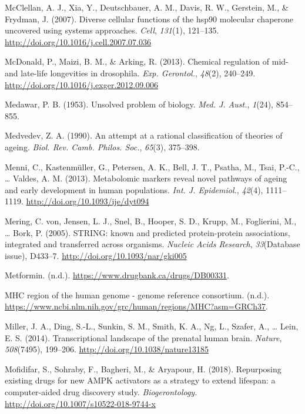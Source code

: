 \documentclass[12pt,twoside]{unicam}
\begin{document}
\begin{cslreferences}
\leavevmode\hypertarget{ref-McClellan2007}{}%
McClellan, A. J., Xia, Y., Deutschbauer, A. M., Davis, R. W., Gerstein, M., \& Frydman, J. (2007). Diverse cellular functions of the hsp90 molecular chaperone uncovered using systems approaches. \emph{Cell}, \emph{131}(1), 121--135. \url{http://doi.org/10.1016/j.cell.2007.07.036}

\leavevmode\hypertarget{ref-McDonald2013}{}%
McDonald, P., Maizi, B. M., \& Arking, R. (2013). Chemical regulation of mid- and late-life longevities in drosophila. \emph{Exp. Gerontol.}, \emph{48}(2), 240--249. \url{http://doi.org/10.1016/j.exger.2012.09.006}

\leavevmode\hypertarget{ref-Medawar1953}{}%
Medawar, P. B. (1953). Unsolved problem of biology. \emph{Med. J. Aust.}, \emph{1}(24), 854--855.

\leavevmode\hypertarget{ref-Medvedev1990}{}%
Medvedev, Z. A. (1990). An attempt at a rational classification of theories of ageing. \emph{Biol. Rev. Camb. Philos. Soc.}, \emph{65}(3), 375--398.

\leavevmode\hypertarget{ref-Menni2013}{}%
Menni, C., Kastenmüller, G., Petersen, A. K., Bell, J. T., Psatha, M., Tsai, P.-C., \ldots{} Valdes, A. M. (2013). Metabolomic markers reveal novel pathways of ageing and early development in human populations. \emph{Int. J. Epidemiol.}, \emph{42}(4), 1111--1119. \url{http://doi.org/10.1093/ije/dyt094}

\leavevmode\hypertarget{ref-VonMering2005}{}%
Mering, C. von, Jensen, L. J., Snel, B., Hooper, S. D., Krupp, M., Foglierini, M., \ldots{} Bork, P. (2005). STRING: known and predicted protein-protein associations, integrated and transferred across organisms. \emph{Nucleic Acids Research}, \emph{33}(Database issue), D433--7. \url{http://doi.org/10.1093/nar/gki005}

\leavevmode\hypertarget{ref-Metformin}{}%
Metformin. (n.d.). \url{https://www.drugbank.ca/drugs/DB00331}.

\leavevmode\hypertarget{ref-mhc2020}{}%
MHC region of the human genome - genome reference consortium. (n.d.). \url{https://www.ncbi.nlm.nih.gov/grc/human/regions/MHC?asm=GRCh37}.

\leavevmode\hypertarget{ref-Miller2014}{}%
Miller, J. A., Ding, S.-L., Sunkin, S. M., Smith, K. A., Ng, L., Szafer, A., \ldots{} Lein, E. S. (2014). Transcriptional landscape of the prenatal human brain. \emph{Nature}, \emph{508}(7495), 199--206. \url{http://doi.org/10.1038/nature13185}

\leavevmode\hypertarget{ref-Mofidifar2018}{}%
Mofidifar, S., Sohraby, F., Bagheri, M., \& Aryapour, H. (2018). Repurposing existing drugs for new AMPK activators as a strategy to extend lifespan: a computer-aided drug discovery study. \emph{Biogerontology}. \url{http://doi.org/10.1007/s10522-018-9744-x}


\end{cslreferences}
\end{document}
